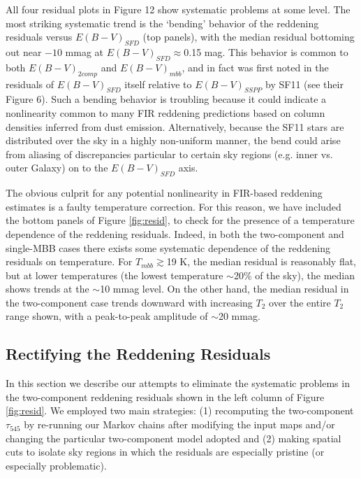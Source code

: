 \documentclass{emulateapj}
\begin{document}
All four residual plots in Figure 12 show systematic problems at some level. 
The most striking systematic trend is the `bending' behavior of the reddening
residuals versus $E(B-V)_{SFD}$ (top panels), with the median residual 
bottoming out near $-10$ mmag at $E(B-V)_{SFD}$$\approx$0.15 mag. This behavior
is common to both $E(B-V)_{2comp}$ and $E(B-V)_{mbb}$, and in fact was first 
noted in the residuals of $E(B-V)_{SFD}$ itself relative to $E(B-V)_{SSPP}$ by 
SF11 (see their Figure 6). Such a bending behavior is troubling because it 
could indicate a nonlinearity common to many FIR reddening predictions based on
column densities inferred from dust emission. Alternatively, because the SF11 
stars are distributed over the sky in a highly non-uniform manner, the bend 
could arise from aliasing of discrepancies particular to certain sky regions 
(e.g. inner vs. outer Galaxy) on to the $E(B-V)_{SFD}$ axis.


The obvious culprit for any potential nonlinearity in FIR-based reddening
estimates is a faulty temperature correction. For this reason, we have included
the bottom panels of Figure \ref{fig:resid}, to check for the presence of
a temperature dependence of the reddening residuals. Indeed, in both the
two-component and single-MBB cases there exists some systematic dependence of
the reddening residuals on temperature. For $T_{mbb}$$\gtrsim$19 K, the 
median residual is reasonably flat, but at lower temperatures (the lowest 
temperature $\sim$20\% of the sky), the median shows trends at the $\sim$10 
mmag level. On the other hand, the median residual in the two-component case 
trends downward with increasing $T_2$ over the entire $T_2$ range shown, with a
peak-to-peak amplitude of $\sim$20 mmag.

\subsection{Rectifying the Reddening Residuals}
In this section we describe our attempts to eliminate the systematic
problems in the two-component reddening residuals shown in the left column
of Figure \ref{fig:resid}. We employed two main strategies: (1) recomputing
the two-component $\tau_{545}$ by re-running our Markov chains after modifying 
the input maps and/or changing the particular two-component model adopted and
(2) making spatial cuts to isolate sky regions in which the 
residuals are especially pristine (or especially problematic).
\end{document}

